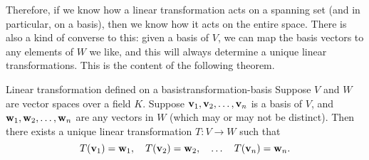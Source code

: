 Therefore, if we know how a linear transformation acts on a spanning
set (and in particular, on a basis), then we know how it acts on the
entire space. There is also a kind of converse to this: given a basis
of $V$, we can map the basis vectors to any elements of $W$ we like,
and this will always determine a unique linear transformations. This
is the content of the following theorem.

\begin{theorem}{Linear transformation defined on a basis}{transformation-basis}
  Suppose $V$ and $W$ are vector spaces over a field $K$. Suppose
  $\mbox{\bf v}_1,\mbox{\bf v}_2,\ldots,\mbox{\bf v}_n$ is a basis of $V$, and
  $\mbox{\bf w}_1,\mbox{\bf w}_2,\ldots,\mbox{\bf w}_n$ are any vectors in $W$
  (which may or may not be distinct). Then there exists a unique
  linear transformation%
  $T:V\to W$ such that
  \begin{equation*}
    T(\mbox{\bf v}_1) = \mbox{\bf w}_1,
    \quad
    T(\mbox{\bf v}_2) = \mbox{\bf w}_2,
    \quad\ldots\quad
    T(\mbox{\bf v}_n) = \mbox{\bf w}_n.
  \end{equation*}
\end{theorem}

